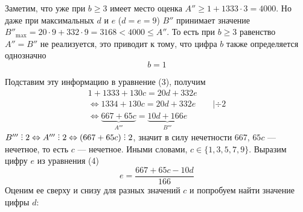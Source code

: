 \documentclass[12pt]{article}
\DeclareRobustCommand{\divby}{%
  \mathrel{\vbox{\baselineskip.65ex\lineskiplimit0pt\hbox{.}\hbox{.}\hbox{.}}}%
}
\begin{document}
    Заметим, что уже при $b \geqslant 3$ имеет место оценка $A'' \geqslant 1 + 1333\cdot3 = 4000$. Но даже при максимальных $d$ и $e$ ($d = e = 9$) $B''$ принимает значение $B''_{\max} = 20\cdot9 + 332\cdot9 = 3168 < 4000 \leqslant A''$. То есть при $b \geqslant 3$ равенство $A'' = B''$ не реализуется, это приводит к тому, что цифра $b$ также определяется однозначно
    $$
        \boxed{b = 1}
    $$

    Подставим эту информацию в уравнение (3), получим
    \begin{gather}
        1 + 1333 + 130c = 20d + 332e \nonumber \\
        \Longleftrightarrow 1334 + 130c = 20d + 332e \qquad | \div 2 \nonumber \\
        \Longleftrightarrow \underbrace{667 + 65c}_{A'''} = \underbrace{10d + 166e}_{B'''}
    \end{gather}
    $B''' \divby 2 \Leftrightarrow A''' \divby 2 \Leftrightarrow (667 + 65c) \divby 2$, значит в силу нечетности 667, $65c$ — нечетное, то есть $c$ — нечетное.
    Иными словами, $c \in \{1, 3, 5, 7, 9\}$. Выразим цифру $e$ из уравнения (4)
    $$
        e = \frac{667 + 65c - 10d}{166}
    $$
    Оценим ее сверху и снизу для разных значений $c$ и попробуем найти значение цифры $d$:
\end{document}
